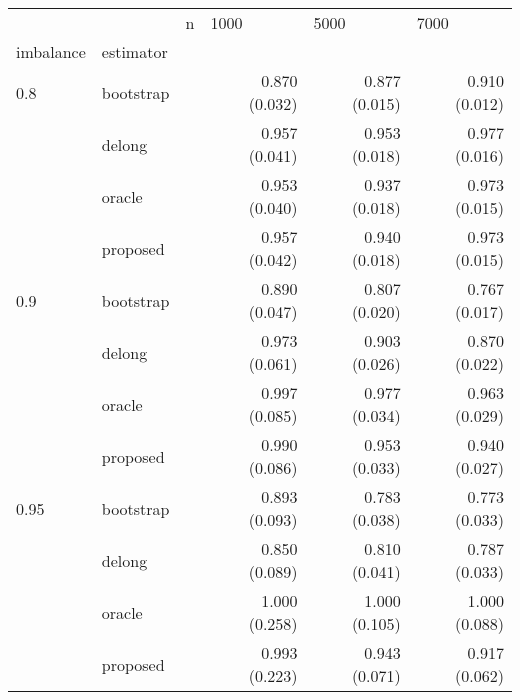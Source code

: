 \begin{tabular}{lll |rrr}
  \hline
           &           & n & \multicolumn{1}{l}{          1000} & \multicolumn{1}{l}{          5000} & \multicolumn{1}{l}{          7000} \\ 
  imbalance & estimator &   & \multicolumn{1}{l}{              } & \multicolumn{1}{l}{              } & \multicolumn{1}{l}{              } \\ 
   \hline
0.8       & bootstrap &   & 0.870 (0.032) & 0.877 (0.015) & 0.910 (0.012) \\ 
            & delong    &   & 0.957 (0.041) & 0.953 (0.018) & 0.977 (0.016) \\ 
            & oracle    &   & 0.953 (0.040) & 0.937 (0.018) & 0.973 (0.015) \\ 
            & proposed  &   & 0.957 (0.042) & 0.940 (0.018) & 0.973 (0.015) \\ 
  0.9       & bootstrap &   & 0.890 (0.047) & 0.807 (0.020) & 0.767 (0.017) \\ 
            & delong    &   & 0.973 (0.061) & 0.903 (0.026) & 0.870 (0.022) \\ 
            & oracle    &   & 0.997 (0.085) & 0.977 (0.034) & 0.963 (0.029) \\ 
            & proposed  &   & 0.990 (0.086) & 0.953 (0.033) & 0.940 (0.027) \\ 
  0.95      & bootstrap &   & 0.893 (0.093) & 0.783 (0.038) & 0.773 (0.033) \\ 
            & delong    &   & 0.850 (0.089) & 0.810 (0.041) & 0.787 (0.033) \\ 
            & oracle    &   & 1.000 (0.258) & 1.000 (0.105) & 1.000 (0.088) \\ 
            & proposed  &   & 0.993 (0.223) & 0.943 (0.071) & 0.917 (0.062) \\ 
   \hline
\end{tabular}

